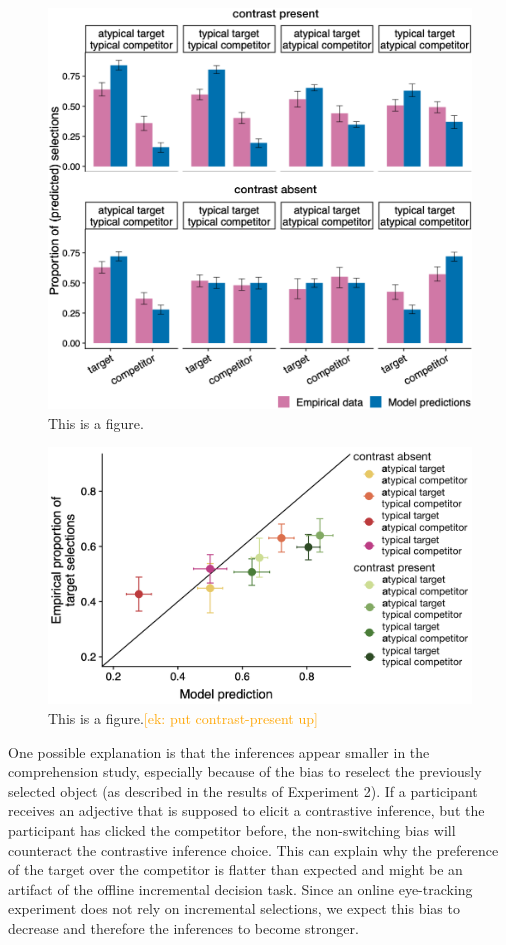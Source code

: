 \documentclass[10pt,letterpaper]{article}
\newcommand{\ek}[1]{\textcolor{Orange}{[ek: #1]}}
\begin{document}
\begin{figure}
	\begin{center}
		\includegraphics[width=.475\textwidth]{graphs/model-bycond-paper.pdf}
	\end{center}
\caption{This is a figure.} 
\label{model-results-flatprior}
\end{figure}

\begin{figure}
	\begin{center}
		\includegraphics[width=.475\textwidth]{graphs/corr-plot.pdf}
	\end{center}
\caption{This is a figure.\ek{put contrast-present up}} 
\label{model-results-corr-flatprior}
\end{figure}

One possible explanation is that the inferences appear smaller in the comprehension study, especially because of the bias to reselect the previously selected object (as described in the results of Experiment 2). If a participant receives an adjective that is supposed to elicit a contrastive inference, but the participant has clicked the competitor before, the non-switching bias will counteract the contrastive inference choice. This can explain why the preference of the target over the competitor is flatter than expected and might be an artifact of the offline incremental decision task. Since an online eye-tracking experiment does not rely on incremental selections, we expect this bias to decrease and therefore the inferences to become stronger.
\end{document}

